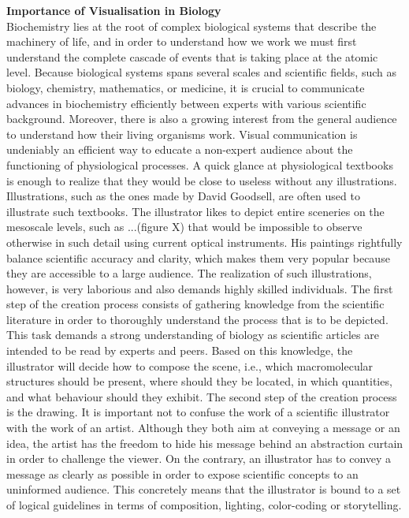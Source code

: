 \textbf{Importance of Visualisation in Biology} \\
Biochemistry lies at the root of complex biological systems that describe the machinery of life, and in order to understand how we work we must first understand the complete cascade of events that is taking place at the atomic level.
Because biological systems spans several scales and scientific fields, such as biology, chemistry, mathematics, or medicine, it is crucial to communicate advances in biochemistry efficiently between experts with various scientific background.
Moreover, there is also a growing interest from the general audience to understand how their living organisms work.
Visual communication is undeniably an efficient way to educate a non-expert audience about the functioning of physiological processes.
A quick glance at physiological textbooks is enough to realize that they would be close to useless without any illustrations.
Illustrations, such as the ones made by David Goodsell, are often used to illustrate such textbooks.
The illustrator likes to depict entire sceneries on the mesoscale levels, such as ...(figure X) that would be impossible to observe otherwise in such detail using current optical instruments.
His paintings rightfully balance scientific accuracy and clarity, which makes them very popular because they are accessible to a large audience. 
The realization of such illustrations, however, is very laborious and also demands highly skilled individuals.
The first step of the creation process consists of gathering knowledge from the scientific literature in order to thoroughly understand the process that is to be depicted.
This task demands a strong understanding of biology as scientific articles are intended to be read by experts and peers.
Based on this knowledge, the illustrator will decide how to compose the scene, i.e., which macromolecular structures should be present, where should they be located, in which quantities, and what behaviour should they exhibit.
The second step of the creation process is the drawing. 
It is important not to confuse the work of a scientific illustrator with the work of an artist.
Although they both aim at conveying a message or an idea, the artist has the freedom to hide his message behind an abstraction curtain in order to challenge the viewer.
On the contrary, an illustrator has to convey a message as clearly as possible in order to expose scientific concepts to an uninformed audience.
This concretely means that the illustrator is bound to a set of logical guidelines in terms of composition, lighting, color-coding or storytelling.

